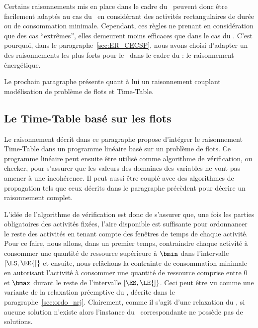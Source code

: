 Certains raisonnements mis en place dans le cadre du \CUSP~peuvent
donc être facilement adaptés au cas du \CECSP~en considérant des
activités rectangulaires de durée ou de consommation
minimale. Cependant, ces règles ne prenant en considération que des
cas ``extrêmes'', elles demeurent moins efficaces que dans le cas du
\CUSP. C'est pourquoi, dans le paragraphe~\ref{sec:ER_CECSP}, nous
avons choisi d'adapter un des raisonnements les plus forts pour le
\CUSP~dans le cadre du \CECSP: le raisonnement énergétique.

Le prochain paragraphe présente quant à lui un raisonnement couplant
modélisation de problème de flots et Time-Table. 

\subsection{Le Time-Table basé sur les flots}

Le raisonnement décrit dans ce paragraphe propose d'intégrer le
raisonnement Time-Table dans un programme linéaire basé sur un
problème de flots. Ce programme linéaire peut ensuite être utilisé
comme algorithme de vérification, ou checker, pour s'assurer que les
valeurs des domaines des variables ne vont pas amener à une
incohérence. Il peut aussi être couplé avec des algorithmes de
propagation tels que ceux décrits dans le paragraphe précèdent pour
décrire un raisonnement complet. 

L'idée de l'algorithme de vérification est donc de s'assurer que, une
fois les parties obligatoires des activités fixées, l'aire disponible
est suffisante pour ordonnancer le reste des activités en tenant
compte des fenêtres de temps de chaque activité. Pour ce faire, nous
allons, dans un premier temps, contraindre chaque activité à consommer
une quantité de ressource supérieure à $\bmin$ dans l'intervalle
$[\LS,\EE{[}$ et ensuite, nous relâchons la contrainte de consommation
minimale en autorisant l'activité à consommer une quantité de
ressource comprise entre $0$ et $\bmax$ durant le reste de l'intervalle
$[\ES,\LE{]}$. Ceci peut être vu comme une variante de la relaxation
préemptive du \CECSP, décrite dans le paragraphe~\ref{sec:ordo_nrj}. 
Clairement, comme il s'agit d'une relaxation du \CECSP, si aucune
solution n'existe alors l'instance du \CECSP~correspondante
ne possède pas de solutions. 

